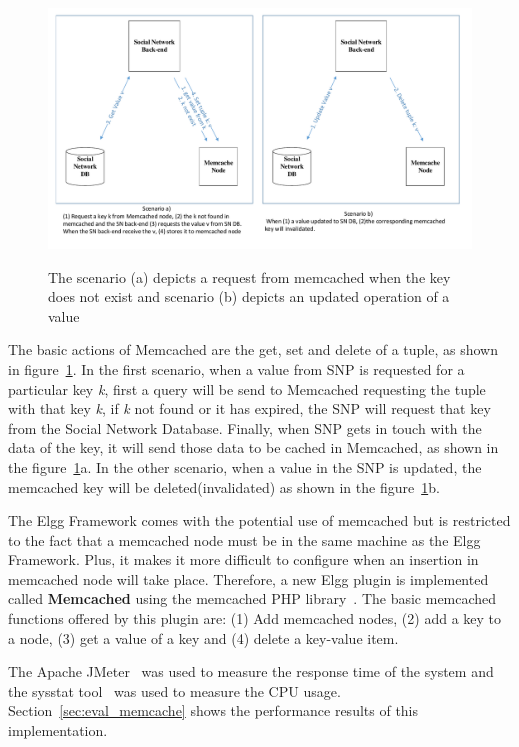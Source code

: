 \begin{figure}[h]
	\caption{The scenario (a) depicts a request from memcached when the key does not exist and scenario (b) depicts an updated operation of a value}
	\includegraphics[width=1\textwidth]{./fig/memcached_key_value.pdf}
	\centering
	\label{fig:memcache_key_value}
\end{figure}

The basic actions of Memcached are the get, set and delete of a tuple, as shown in figure~\ref{fig:memcache_key_value}. In the first scenario, when a value from SNP is requested for a particular key {\it k}, first a query will be send to Memcached requesting the tuple with that key {\it k}, if {\it k} not found or it has expired, the SNP will request that key from the Social Network Database. Finally, when SNP gets in touch with the data of the key, it will send those data to be cached in Memcached, as shown in the figure~\ref{fig:memcache_key_value}a. In the other scenario, when a value in the SNP is updated, the memcached key will be deleted(invalidated) as shown in the figure~\ref{fig:memcache_key_value}b.

The Elgg Framework comes with the potential use of memcached but is restricted to the fact that a memcached node must be in the same machine as the Elgg Framework. Plus, it makes it more difficult to configure when an insertion in memcached node will take place. Therefore, a new Elgg plugin is implemented called \textbf{Memcached} using the memcached PHP library~\cite{memcached_php_doc}. The basic memcached functions offered by this plugin are: (1) Add memcached nodes, (2) add a key to a node, (3) get a value of a key and (4) delete a key-value item. 

The Apache JMeter~\cite{jmeter_url} was used to measure the response time of the system and the sysstat tool~\cite{sysstat_url} was used to measure the CPU usage. Section~\ref{sec:eval_memcache} 
 shows the performance results of this implementation.

